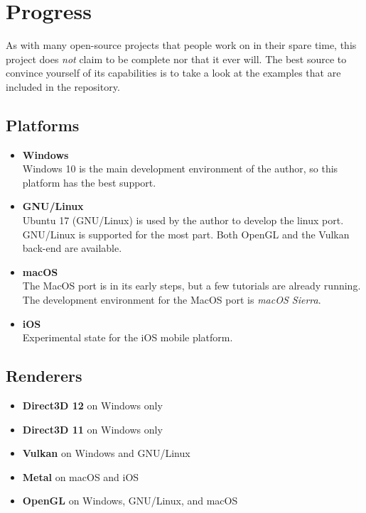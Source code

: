 \documentclass{article}
\begin{document}

\newpage
\section{Progress}

As with many open-source projects that people work on in their spare time, this project does \emph{not} claim to be complete nor that it ever will.
The best source to convince yourself of its capabilities is to take a look at the examples that are included in the \LLGL repository.

\subsection{Platforms}
\begin{itemize}
	\item \textbf{Windows} \\
	Windows 10 is the main development environment of the author, so this platform has the best support.
	
	\item \textbf{GNU/Linux} \\
	Ubuntu 17 (GNU/Linux) is used by the author to develop the linux port. GNU/Linux is supported for the most part.
	Both OpenGL and the Vulkan back-end are available.
	
	\item \textbf{macOS} \\
	The MacOS port is in its early steps, but a few tutorials are already running.
	The development environment for the MacOS port is \emph{macOS Sierra}.
	
	\item \textbf{iOS} \\
	Experimental state for the iOS mobile platform.
\end{itemize}
	
\subsection{Renderers}
\begin{itemize}
	\item \textbf{Direct3D 12} on Windows only
	\item \textbf{Direct3D 11} on Windows only
	\item \textbf{Vulkan} on Windows and GNU/Linux
	\item \textbf{Metal} on macOS and iOS
	\item \textbf{OpenGL} on Windows, GNU/Linux, and macOS
\end{itemize}
\end{document}
